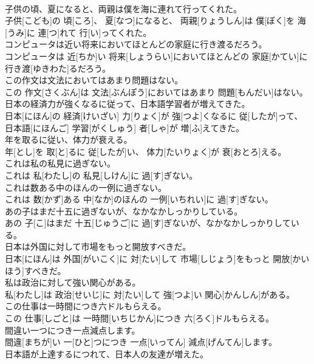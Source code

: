 \documentclass[8pt]{extreport}
\begin{document}
\begin{CJK}{UTF8}{min}
\\	子供の頃、夏になると、両親は僕を海に連れて行ってくれた。	
\\	子供[こども]の 頃[ころ]、 夏[なつ]になると、 両親[りょうしん]は 僕[ぼく]を 海[うみ]に 連[つ]れて 行[い]ってくれた。	
\\	コンピュータは近い将来においてほとんどの家庭に行き渡るだろう。	
\\	コンピュータは 近[ちか]い 将来[しょうらい]においてほとんどの 家庭[かてい]に 行き渡[ゆきわた]るだろう。	
\\	この作文は文法においてはあまり問題はない。	
\\	この 作文[さくぶん]は 文法[ぶんぽう]においてはあまり 問題[もんだい]はない。	
\\	日本の経済力が強くなるに従って、日本語学習者が増えてきた。	
\\	日本[にほん]の 経済[けいざい] 力[りょく]が 強[つよ]くなるに 従[したが]って、 日本語[にほんご] 学習[がくしゅう] 者[しゃ]が 増[ふ]えてきた。	
\\	年を取るに従い、体力が衰える。	
\\	年[とし]を 取[と]るに 従[したが]い、 体力[たいりょく]が 衰[おとろ]える。	
\\	これは私の私見に過ぎない。	
\\	これは 私[わたし]の 私見[しけん]に 過[す]ぎない。	
\\	これは数ある中のほんの一例に過ぎない。	
\\	これは 数[かず]ある 中[なか]のほんの 一例[いちれい]に 過[す]ぎない。	
\\	あの子はまだ十五に過ぎないが、なかなかしっかりしている。	
\\	あの 子[こ]はまだ 十五[じゅうご]に 過[す]ぎないが、なかなかしっかりしている。	
\\	日本は外国に対して市場をもっと開放すべきだ。	
\\	日本[にほん]は 外国[がいこく]に 対[たい]して 市場[しじょう]をもっと 開放[かいほう]すべきだ。	
\\	私は政治に対して強い関心がある。	
\\	私[わたし]は 政治[せいじ]に 対[たい]して 強[つよ]い 関心[かんしん]がある。	
\\	この仕事は一時間につき六ドルもらえる。	
\\	この 仕事[しごと]は 一時間[いちじかん]につき 六[ろく]ドルもらえる。	
\\	間違い一つにつき一点減点します。	
\\	間違[まちが]い 一[ひと]つにつき 一点[いってん] 減点[げんてん]します。	
\\	日本語が上達するにつれて、日本人の友達が増えた。	

\end{CJK}
\end{document}
